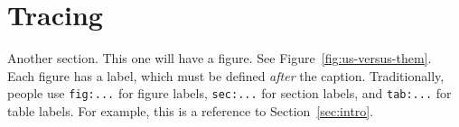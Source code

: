 \section{Tracing}

Another section. This one will have a figure. See
Figure~\ref{fig:us-versus-them}. Each figure has a label, which must be
defined \emph{after} the caption. Traditionally, people use
\texttt{fig:...} for figure labels, \texttt{sec:...} for section
labels, and \texttt{tab:...} for table labels. For example, this is a
reference to Section~\ref{sec:intro}. 

